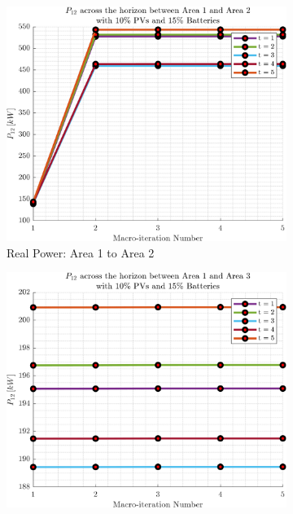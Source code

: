 \documentclass[../../outputs/main.tex]{subfiles}
\begin{document}
\begin{figure}[h!]
    \centering
    \begin{subfigure}[b]{0.3\textwidth}
        \centering
        \includegraphics[width=\textwidth]{../figures/T5-pv10-batt15-PBoundary/BoundaryRealPower_vs_t_vs_macroItr_5Areas_1_2_genCost_pv_10_batt_15_.png}
        \caption{Real Power: Area 1 to Area 2}
        \label{fig:real_power_1_2}
    \end{subfigure}
    \hfill
    \begin{subfigure}[b]{0.3\textwidth}
        \centering
        \includegraphics[width=\textwidth]{../figures/T5-pv10-batt15-PBoundary/BoundaryRealPower_vs_t_vs_macroItr_5Areas_1_3_genCost_pv_10_batt_15_.png}

\end{subfigure}
\end{figure}
\end{document}
